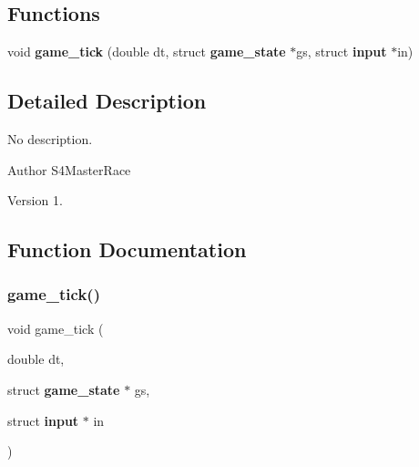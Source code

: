 \subsection*{Functions}
\begin{DoxyCompactItemize}
\item 
void \textbf{ game\+\_\+tick} (double dt, struct \textbf{ game\+\_\+state} $\ast$gs, struct \textbf{ input} $\ast$in)
\end{DoxyCompactItemize}


\subsection{Detailed Description}
No description. 

\begin{DoxyAuthor}{Author}
S4\+Master\+Race 
\end{DoxyAuthor}
\begin{DoxyVersion}{Version}
1. 
\end{DoxyVersion}


\subsection{Function Documentation}
\mbox{\label{game_8h_a10f5cd5247eacbae60944fd4a9ad295a}} 
\subsubsection{game\+\_\+tick()}
{\footnotesize\ttfamily void game\+\_\+tick (\begin{DoxyParamCaption}\item[{double}]{dt,  }\item[{struct \textbf{ game\+\_\+state} $\ast$}]{gs,  }\item[{struct \textbf{ input} $\ast$}]{in }\end{DoxyParamCaption})}

